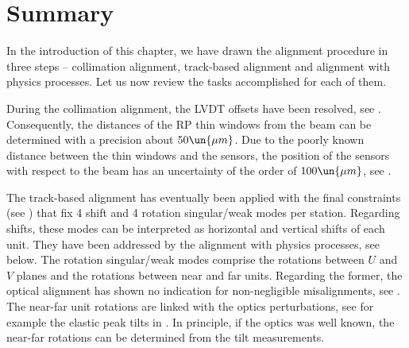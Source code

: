 \iffalse
\htab{al el ylyr}{
Left: the results of the elastic alignment method 4 -- fits of $y^{56}$ vs.~$y^{45}$ data. \TODO{}}{
\omit&\multispan2\bhrulefill\cr
\omit&\strut\hbox{near units}&\hbox{far units}\cr\bln
\hbox{21 Sep}    & -40.4 \pm   21.3&  78.6 \pm   21.4\cr\ln
\hbox{05 Oct}    & 170.8 \pm   26.3& 264.5 \pm   28.6\cr\ln
\hbox{07 Oct}    &  95.4 \pm   20.2& 181.9 \pm   21.8\cr\ln
\hbox{24 Oct}    & -75.8 \pm   10.7&  15.3 \pm   11.4\cr\ln
\hbox{26 Oct}    &  19.5 \pm    9.1&  98.6 \pm    9.9\cr\ln
\hbox{29-30 Oct} &-240.9 \pm    4.9&-158.3 \pm    4.9\cr\bln
}

-80		\pm30	&27		\pm31
377		\pm69	&477	\pm77
192		\pm55	&284	\pm61
-84		\pm30	&5		\pm33
56		\pm24	&145	\pm27
-270	\pm7	&-187	\pm7
\fi



\section[al sum]{Summary}

In the introduction of this chapter, we have drawn the alignment procedure in three steps -- collimation alignment, track-based alignment and alignment with physics processes. Let us now review the tasks accomplished for each of them.

\> During the collimation alignment, the LVDT offsets have been resolved, see . Consequently, the distances of the RP thin windows from the beam can be determined with a precision about $50\un{\mu m}$. Due to the poorly known distance between the thin windows and the sensors, the position of the sensors with respect to the beam has an uncertainty of the order of $100\un{\mu m}$, see .

\> The track-based alignment has eventually been applied with the final constraints (see ) that fix 4 shift and 4 rotation singular/weak modes per station. Regarding shifts, these modes can be interpreted as horizontal and vertical shifts of each unit. They have been addressed by the alignment with physics processes, see below. The rotation singular/weak modes comprise the rotations between $U$ and $V$ planes and the rotations between near and far units. Regarding the former, the optical alignment has shown no indication for non-negligible misalignments, see . The near-far unit rotations are linked with the optics perturbations, see for example the elastic peak tilts in . In principle, if the optics was well known, the near-far rotations can be determined from the tilt measurements.

